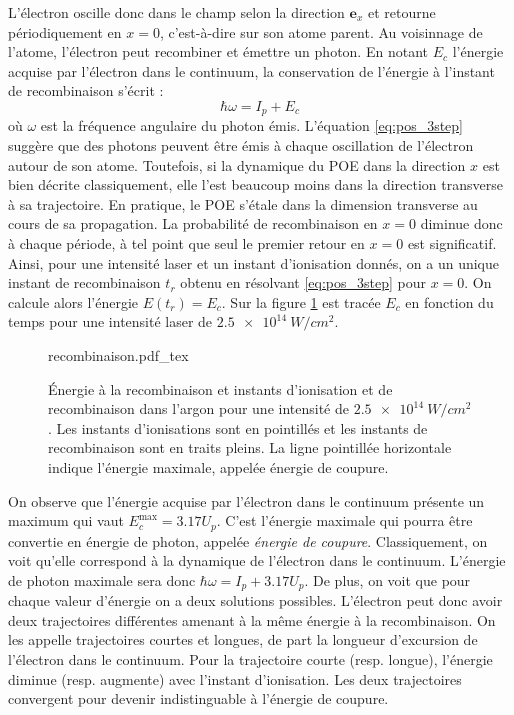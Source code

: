 L'électron oscille donc dans le champ selon la direction $\bm{e}_x$ et retourne périodiquement en $x=0$, c'est-à-dire sur son atome parent. Au voisinnage de l'atome, l'électron peut recombiner et émettre un photon. En notant $E_c$ l'énergie acquise par l'électron dans le continuum, la conservation de l'énergie à l'instant de recombinaison s'écrit :
\begin{equation}
\hbar\omega = I_p+E_c
\end{equation}
où $\omega$ est la fréquence angulaire du photon émis. L'équation \ref{eq:pos_3step} suggère que des photons peuvent être émis à chaque oscillation de l'électron autour de son atome. Toutefois, si la dynamique du POE dans la direction $x$ est bien décrite classiquement, elle l'est beaucoup moins dans la direction transverse à sa trajectoire. En pratique, le POE s'étale dans la dimension transverse au cours de sa propagation. La probabilité de recombinaison en $x=0$ diminue donc à chaque période, à tel point que seul le premier retour en $x=0$ est significatif. Ainsi, pour une intensité laser et un instant d'ionisation donnés, on a un unique instant de recombinaison $t_r$ obtenu en résolvant \ref{eq:pos_3step} pour $x=0$. On calcule alors l'énergie $E(t_r) = E_c$. Sur la figure \ref{fig:recombinaison} est tracée $E_c$ en fonction du temps pour une intensité laser de $\SI{2.5e14}{W/cm^2}$.

\begin{figure}[!ht]
\centering
\def\svgwidth{\columnwidth}
{recombinaison.pdf_tex}
\caption{\'Energie à la recombinaison et instants d'ionisation et de recombinaison dans l'argon pour une intensité de $\SI{2.5e14}{W/cm^2}$. Les instants d'ionisations sont en pointillés et les instants de recombinaison sont en traits pleins. La ligne pointillée horizontale indique l'énergie maximale, appelée énergie de coupure.}
\label{fig:recombinaison}
\end{figure}

On observe que l'énergie acquise par l'électron dans le continuum présente un maximum qui vaut $E_c^{\text{max}} = 3.17 U_p$. C'est l'énergie maximale qui pourra être convertie en énergie de photon, appelée \textit{énergie de coupure}. Classiquement, on voit qu'elle correspond à la dynamique de l'électron dans le continuum. L'énergie de photon maximale sera donc $\hbar\omega = I_p+3.17 U_p$. De plus, on voit que pour chaque valeur d'énergie on a deux solutions possibles. L'électron peut donc avoir deux trajectoires différentes amenant à la même énergie à la recombinaison. On les appelle trajectoires courtes et longues, de part la longueur d'excursion de l'électron dans le continuum. Pour la trajectoire courte (resp. longue), l'énergie diminue (resp. augmente) avec l'instant d'ionisation. Les deux trajectoires convergent pour devenir indistinguable à l'énergie de coupure.

